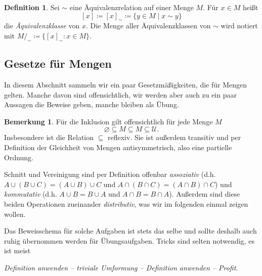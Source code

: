 \documentclass[11pt, a4paper]{article}
\theoremstyle{definition}
\newtheorem{definition}{Definition}[section]
\newtheorem*{remark*}{Bemerkung}
\theoremstyle{plain}
\numberwithin{equation}{section}
\let\emptyset\varnothing
\begin{document}
\begin{definition}\label{def:equivalenceclass}
	Sei $\sim$ eine Äquivalenzrelation auf einer Menge $M$. Für $x \in M$ heißt
	$$
		[x] \coloneqq [x]_\sim \coloneqq \{ y \in M \mid x \sim y \}
	$$
	die \textit{Äquivalenzklasse} von $x$. Die Menge aller Äquivalenzklassen von $\sim$ wird notiert mit $M /_\sim \coloneqq \{ [x]_\sim : x \in M \}$.
\end{definition}



\subsection{Gesetze für Mengen}\label{sec:pre_setlaws}
In diesem Abschnitt sammeln wir ein paar Gesetzmäßigkeiten, die für Mengen gelten. Manche davon sind offensichtlich, wir werden aber auch zu ein paar Aussagen die Beweise geben, manche bleiben als Übung.
\begin{remark*}
	Für die Inklusion gilt offensichtlich für jede Menge $M$
	$$
		\emptyset \subseteq M \subseteq M \subseteq \mathcal{U}.
	$$
	Insbesondere ist die Relation $\subseteq$ reflexiv. Sie ist außerdem transitiv und per Definition der Gleichheit von Mengen antisymmetrisch, also eine partielle Ordnung.\par
	Schnitt und Vereinigung sind per Definition offenbar \textit{assoziativ} (d.h. $A \cup (B \cup C) = (A \cup B) \cup C$ und $A \cap (B \cap C) = (A \cap B) \cap C$) und \textit{kommutativ} (d.h. $A \cup B = B \cup A$ und $A \cap B = B \cap A$). Außerdem sind diese beiden Operationen zueinander \textit{distributiv}, was wir im folgenden einmal zeigen wollen. 
\end{remark*}
Das Beweisschema für solche Aufgaben ist stets das selbe und sollte deshalb auch ruhig übernommen werden für Übungsaufgaben. Tricks sind selten notwendig, es ist meist
\begin{center}
	\textit{Definition anwenden -- triviale Umformung -- Definition anwenden -- Profit}.
\end{center}
\end{document}
